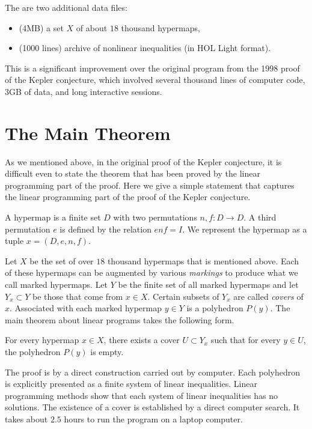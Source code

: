 \documentclass{llncs}
\begin{document}
The are two additional data files:

\begin{itemize}
\item (4MB) a set $X$ of about $18$ thousand hypermaps,
\item (1000 lines) archive of nonlinear inequalities (in HOL Light format).
\end{itemize}



This is a significant improvement over the 
original program from the 1998 proof of the Kepler
conjecture, which involved several thousand lines
of computer code, 3GB of data, and long interactive
sessions.

\section{The Main Theorem}

As we mentioned above, in the original proof of the Kepler conjecture,
it is difficult even to state the theorem that has been proved by the
linear programming part of the proof.  Here we give a simple
statement that captures the linear programming part of the proof of
the Kepler conjecture.

\begin{definition} A hypermap is a finite set $D$ with two
  permutations $n,f:D\to D$.  A third permutation $e$ is defined by
  the relation $e n f = I$.  We represent the hypermap as a tuple
  $x=(D,e,n,f)$.
\end{definition}

Let $X$ be the set of over $18$ thousand hypermaps that is mentioned above.
Each of these hypermaps can be augmented by various {\it markings} to
produce what we call marked hypermaps.  Let $Y$ be the finite set of
all marked hypermaps and let $Y_x\subset Y$ be those that come from
$x\in X$.  Certain subsets of $Y_x$ are called {\it covers} of $x$.  Associated with each marked hypermap $y\in Y$ is a polyhedron $P(y)$.
The main theorem about linear programs takes the following form.

\begin{theorem} For every hypermap $x\in X$, there exists a cover $U\subset Y_x$
such that for every $y\in U$, the polyhedron $P(y)$ is empty.
\end{theorem}

The proof is by a direct construction carried out by computer.  Each
polyhedron is explicitly presented as a finite system of linear
inequalities.  Linear programming methods show that each system of
linear inequalities has no solutions.  The existence of a cover is
established by a direct computer search.  
It takes about $2.5$ hours to run the program
on a laptop computer.
\end{document}
